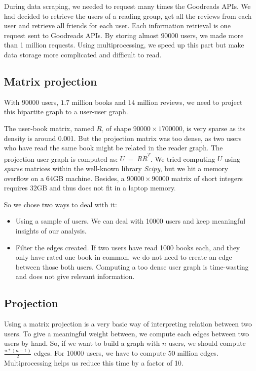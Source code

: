 \documentclass[11pt]{article}
\begin{document}
During data scraping, we needed to request many times the Goodreads APIs.
We had decided to retrieve the users of a reading group, get all the reviews from each user and retrieve all friends for each user.
Each information retrieval is one request sent to Goodreads APIs.
By storing almost $90000$ users, we made more than 1 million requests. Using multiprocessing, we speed up this part but make data storage more complicated and difficult to read.

\subsection{Matrix projection}

With $90000$ users, $1.7$ million books and $14$ million reviews, we need to project this bipartite graph to a user-user graph.

The user-book matrix, named $R$, of shape $90000 \times 1700000$, is very sparse as its density is around 0.001. But the projection matrix was too dense, as two users who have read the same book might be related in the reader graph.
The projection user-graph is computed as: $U~=~R \dot R^T$.
We tried computing $U$ using \emph{sparse} matrices within the well-known library \emph{Scipy}\cite{scipy}, but we hit a memory overflow on a 64GB machine.
Besides, a $90000 \times 90000$ matrix of short integers requires $32$GB and thus does not fit in a laptop memory.

So we chose two ways to deal with it:
\begin{itemize}
\item Using a sample of users. We can deal with 10000 users and keep meaningful insights of our analysis.
\item Filter the edges created. If two users have read 1000 books each, and they only have rated one book in common, we do not need to create an edge between those both users. Computing a too dense user graph is time-wasting and does not give relevant information.
\end{itemize}

\subsection{Projection}

Using a matrix projection is a very basic way of interpreting relation between two users. To give a meaningful weight between, we compute each edges between two users by hand. So, if we want to build a graph with $n$ users, we should compute $\frac{n * (n-1)}{2}$ edges. 
For 10000 users, we have to compute 50 million edges. Multiprocessing helps us reduce this time by a factor of 10.
\end{document}
